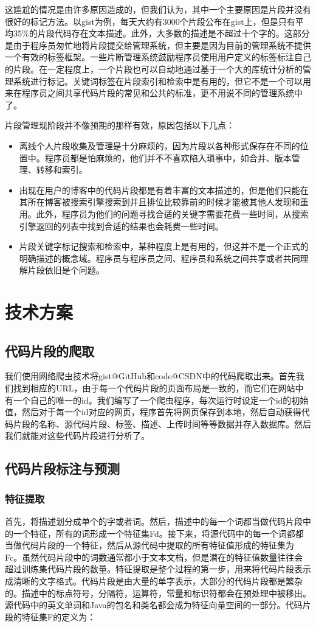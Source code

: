 \documentclass[10pt,journal,draftcls,onecolumn]{IEEEtran}
\begin{document}
\begin{CJK*}{UTF8}{gbsn}
这尴尬的情况是由许多原因造成的，但我们认为，其中一个主要原因是片段并没有很好的标记方法。以gist为例，每天大约有3000个片段公布在gist上，但是只有平均35$\%$的片段代码存在文本描述。此外，大多数的描述是不超过十个字的。这部分是由于程序员匆忙地将片段提交给管理系统，但主要是因为目前的管理系统不提供一个有效的标签框架。一些片断管理系统鼓励程序员使用用户定义的标签标注自己的片段。在一定程度上，一个片段也可以自动地通过基于一个大的库统计分析的管理系统进行标记。关键词标签在片段索引和检索中是有用的，但它不是一个可以用来在程序员之间共享代码片段的常见和公共的标准，更不用说不同的管理系统中了。

片段管理现阶段并不像预期的那样有效，原因包括以下几点：
\begin{itemize}
    \item 离线个人片段收集及管理是十分麻烦的，因为片段以各种形式保存在不同的位置中。程序员都是怕麻烦的，他们并不不喜欢陷入琐事中，如合并、版本管理、转移和索引。
    \item 出现在用户的博客中的代码片段都是有着丰富的文本描述的，但是他们只能在其所在博客被搜索引擎搜索到并且排位比较靠前的时候才能被其他人发现和重用。此外，程序员为他们的问题寻找合适的关键字需要花费一些时间，从搜索引擎返回的列表中找到合适的结果也会耗费一些时间。
    \item 片段关键字标记搜索和检索中，某种程度上是有用的，但这并不是一个正式的明确描述的概念域。程序员与程序员之间、程序员和系统之间共享或者共同理解片段依旧是个问题。
\end{itemize}
\section{技术方案}
\subsection{代码片段的爬取}
我们使用网络爬虫技术将gist@GitHub和code@CSDN中的代码爬取出来。首先我们找到相应的URL，由于每一个代码片段的页面布局是一致的，而它们在网站中有一个自己的唯一的id。我们编写了一个爬虫程序，每次运行时设定一个id的初始值，然后对于每一个id对应的网页，程序首先将网页保存到本地，然后自动获得代码片段的名称、源代码片段、标签、描述、上传时间等等数据并存入数据库。然后我们就能对这些代码片段进行分析了。

\subsection{代码片段标注与预测}
\subsubsection{特征提取}
首先，将描述划分成单个的字或者词。然后，描述中的每一个词都当做代码片段中的一个特征，所有的词形成一个特征集Fd。接下来，将源代码中的每一个词都都当做代码片段的一个特征，然后从源代码中提取的所有特征值形成的特征集为Fc。虽然代码片段中的词数通常都小于文本文档，但是潜在的特征值数量往往会超过训练集代码片段的数量。特征提取是整个过程的第一步，用来将代码片段表示成清晰的文字格式。代码片段是由大量的单字表示，大部分的代码片段都是繁杂的。描述中的标点符号，分隔符，运算符，常量和标识符都会在预处理中被移出。源代码中的英文单词和Java的包名和类名都会成为特征向量空间的一部分。代码片段的特征集F的定义为：


\end{CJK*}
\end{document}

